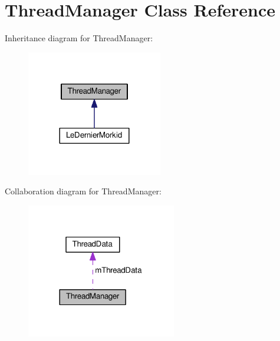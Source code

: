 \hypertarget{class_thread_manager}{}\section{Thread\+Manager Class Reference}
\label{class_thread_manager}


Inheritance diagram for Thread\+Manager\+:\nopagebreak
\begin{figure}[H]
\begin{center}
\leavevmode
\includegraphics[width=168pt]{class_thread_manager__inherit__graph}
\end{center}
\end{figure}


Collaboration diagram for Thread\+Manager\+:\nopagebreak
\begin{figure}[H]
\begin{center}
\leavevmode
\includegraphics[width=185pt]{class_thread_manager__coll__graph}
\end{center}
\end{figure}
